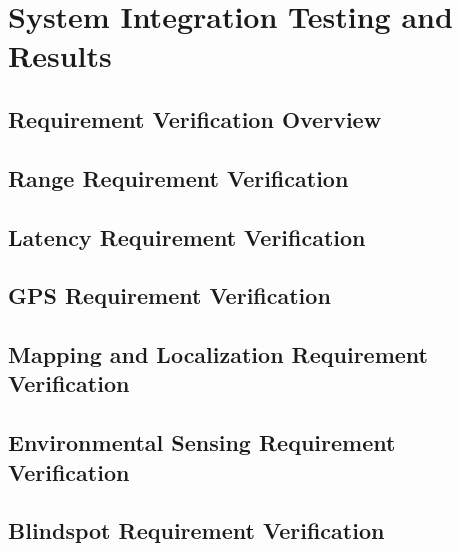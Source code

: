 \chapter{System Integration Testing and Results}

\section{Requirement Verification Overview}

\section{Range Requirement Verification}

\section{Latency Requirement Verification}

\section{GPS Requirement Verification}

\section{Mapping and Localization Requirement Verification}

\section{Environmental Sensing Requirement Verification}

\section{Blindspot Requirement Verification}